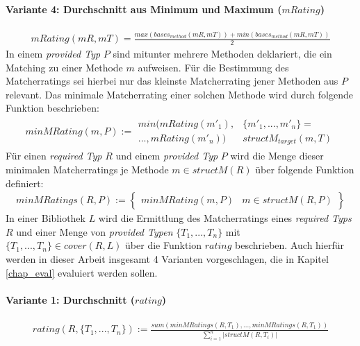\paragraph{Variante 4: Durchschnitt aus Minimum und Maximum ($\mathit{mRating}$)}

\begin{gather*}
\mathit{mRating(mR,mT)} = \frac{\mathit{max(bases_{method}(mR,mT))}+\mathit{min(bases_{method}(mR,mT))}}{2}
\end{gather*}
\noindent
In einem \emph{provided Typ} $P$ sind mitunter mehrere Methoden deklariert, die ein Matching zu einer Methode $m$ aufweisen. Für die Bestimmung des Matcherratings sei hierbei nur das kleinste Matcherrating jener Methoden aus $P$ relevant. Das minimale Matcherrating einer solchen Methode wird durch folgende Funktion beschrieben:
\begin{gather*}
\mathit{minMRating(m, P)} := 
	\begin{array}{l|l}
\mathit{min(mRating(m'_1),}
&
\{\mathit{m'_1,...,m'_n}\} =
\\
\mathit{...,mRating(m'_n))}
&
\mathit{structM_{target}(m, T)}
\end{array}
\end{gather*}
\noindent
Für einen \emph{required Typ} $R$ und einem \emph{provided Typ} $P$ wird die Menge dieser minimalen Matcherratings je Methode $m \in \mathit{structM(R)}$ über folgende Funktion definiert:
\begin{gather*}
\mathit{minMRatings(R,P)} := \left\{
\begin{array}{l|l}
	\mathit{minMRating(m,P)}
	& 
	m \in \mathit{structM(R,P)}
\end{array}
\right\}
\end{gather*}
\noindent
In einer Bibliothek $L$ wird die Ermittlung des Matcherratings eines \emph{required Typs} $R$ und einer Menge von \emph{provided Typen} $\{T_1,...,T_n\}$ mit $\{T_1,...,T_n\} \in \mathit{cover(R,L)}$ über die Funktion $\mathit{rating}$ beschrieben. Auch hierfür werden in dieser Arbeit insgesamt 4 Varianten vorgeschlagen, die in Kapitel \ref{chap_eval} evaluiert werden sollen.
\paragraph{Variante 1: Durchschnitt ($\mathit{rating}$)}

\begin{gather*}
\mathit{rating(R,\{T_1,...,T_n\})} := \frac{\mathit{sum(minMRatings(R,T_1),...,minMRatings(R,T_1))}}{\sum_{i=1}^{n}|\mathit{structM(R,T_i)}|}
\end{gather*}

